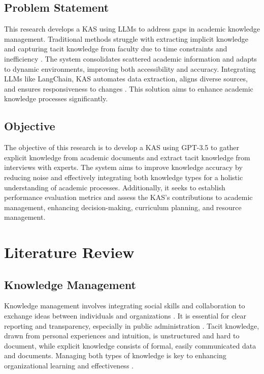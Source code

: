 \documentclass[runningheads]{llncs}
\begin{document}
\subsection{Problem Statement}
This research develops a KAS using LLMs to address gaps in academic knowledge management. Traditional methods struggle with extracting implicit knowledge and capturing tacit knowledge from faculty due to time constraints and inefficiency \cite{kiran2019}. The system consolidates scattered academic information and adapts to dynamic environments, improving both accessibility and accuracy. Integrating LLMs like LangChain, KAS automates data extraction, aligns diverse sources, and ensures responsiveness to changes \cite{deepLearning2023LangChain}. This solution aims to enhance academic knowledge processes significantly.

\subsection{Objective}
The objective of this research is to develop a KAS using GPT-3.5 to gather explicit knowledge from academic documents and extract tacit knowledge from interviews with experts. The system aims to improve knowledge accuracy by reducing noise and effectively integrating both knowledge types for a holistic understanding of academic processes. Additionally, it seeks to establish performance evaluation metrics and assess the KAS's contributions to academic management, enhancing decision-making, curriculum planning, and resource management.

\section{Literature Review}
\subsection{Knowledge Management}
Knowledge management involves integrating social skills and collaboration to exchange ideas between individuals and organizations \cite{Gao2021}. It is essential for clear reporting and transparency, especially in public administration \cite{Bem2022}. Tacit knowledge, drawn from personal experiences and intuition, is unstructured and hard to document, while explicit knowledge consists of formal, easily communicated data and documents. Managing both types of knowledge is key to enhancing organizational learning and effectiveness \cite{vincent2022}.
\end{document}
